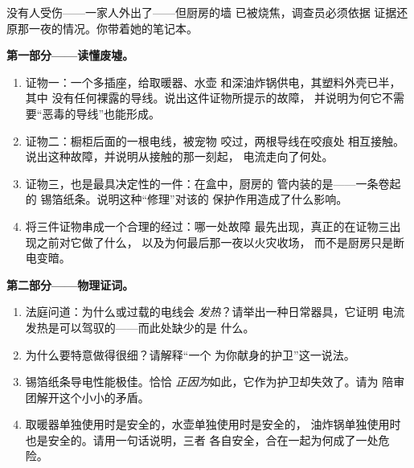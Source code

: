 \begin{problem}\label{pb:g7:short-circuits-safety:1}
没有人受伤——一家人外出了——但厨房的墙
已被烧焦，调查员必须依据
证据还原那一夜的情况。你带着她的笔记本。

\medskip\noindent\textbf{第一部分——读懂废墟。}
\begin{enumerate}
  \item 证物一：一个多插座，给取暖器、水壶
        和深油炸锅供电，其塑料外壳已半，其中
        没有任何裸露的导线。说出这件证物所提示的故障，
        并说明为何它不需要“恶毒的导线”也能形成。
  \item 证物二：橱柜后面的一根电线，被宠物
        咬过，两根导线在咬痕处
        相互接触。说出这种故障，并说明从接触的那一刻起，
        电流走向了何处。
  \item 证物三，也是最具决定性的一件：在盒中，厨房的
        管内装的是——一条卷起的
        锡箔纸条。说明这种“修理”对该的
        保护作用造成了什么影响。
  \item 将三件证物串成一个合理的经过：哪一处故障
        最先出现，真正的在证物三出现之前对它做了什么，
        以及为何最后那一夜以火灾收场，
        而不是厨房只是断电变暗。
\end{enumerate}

\medskip\noindent\textbf{第二部分——物理证词。}
\begin{enumerate}[resume]
  \item 法庭问道：为什么或过载的电线会
        \emph{发热}？请举出一种日常器具，它证明
        电流发热是可以驾驭的——而此处缺少的是
        什么。
  \item 为什么要特意做得很细？请解释“一个
        为你献身的护卫”这一说法。
  \item 锡箔纸条导电性能极佳。恰恰
        \emph{正因为}如此，它作为护卫却失效了。请为
        陪审团解开这个小小的矛盾。
  \item 取暖器单独使用时是安全的，水壶单独使用时是安全的，
        油炸锅单独使用时也是安全的。请用一句话说明，三者
        各自安全，合在一起为何成了一处危险。
\end{enumerate}


\end{problem}
